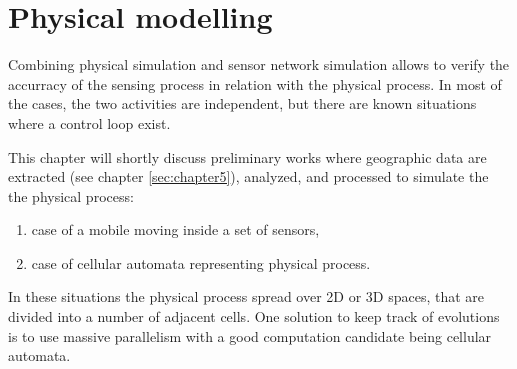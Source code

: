 
\chapter{Physical modelling}

Combining physical simulation and sensor network simulation allows to verify
the accurracy of the sensing process in relation with the physical process.
In most of the cases, the two activities are independent, but there are known situations
where a control loop exist.

This chapter will shortly discuss preliminary works where geographic data are
extracted (see chapter \ref{sec:chapter5}), analyzed, and processed to simulate the
the physical process:
\begin{enumerate}
\item case of a mobile moving inside a set of sensors,
\item case of cellular automata representing physical process.
\end{enumerate}


In these situations the physical process spread over 2D or 3D spaces, that are
divided into a number of adjacent cells. One solution to keep track of evolutions 
is to use massive parallelism with a good computation candidate being cellular automata.
